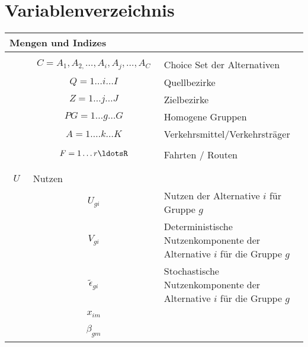 \section*{Variablenverzeichnis}
\begin{table}[htbp]
  \centering
\begin{tabular}{|p{3cm}|p{3cm}|p{3cm}|}\hline
\multicolumn{3}{|l|}{Mengen und Indizes}\\\hline
 &  & \\\hline
 & 
\begin{align}
C = {{{A}_{1}},{{A}_{2,}}\ldots,{{A}_{i}},{{A}_{j}},\ldots,{{A}_{C}}}
\end{align}
 & Choice Set der Alternativen\\\hline
 & 
\begin{align}
Q={1 \ldots i \ldots I}
\end{align}
 & Quellbezirke\\\hline
 & 
\begin{align}
Z={1 \ldots j \ldots J}
\end{align}
 & Zielbezirke\\\hline
 & 
\begin{align}
PG={1 \ldots g \ldots G}
\end{align}
 & Homogene Gruppen\\\hline
 & 
\begin{align}
A={1\ldots. k \ldots K}
\end{align}
 & Verkehrsmittel/Verkehrsträger\\\hline
 & 
\begin{align}
F={1\ldots r \ldotsR}
\end{align}
 & Fahrten / Routen\\\hline
 &  & \\\hline

\begin{align}
U
\end{align}
 & Nutzen & \\\hline
 & 
\begin{align}
{{U}_{gi}}
\end{align}
 & Nutzen der Alternative $i$ für Gruppe $g$\\\hline
 & 
\begin{align}
{{V}_{gi}}
\end{align}
 & Deterministische Nutzenkomponente der Alternative $i$ für die Gruppe $g$\\\hline
 & 
\begin{align}
{{\widetilde{{\epsilon }}}_{gi}}
\end{align}
 & Stochastische Nutzenkomponente der Alternative $i$ für die Gruppe $g$\\\hline
 & 
\begin{align}
{{x}_{im}}
\end{align}
 & \\\hline
 & 
\begin{align}
{{\beta }_{gm}}
\end{align}
 & \\\hline


\end{tabular}
\end{table}

